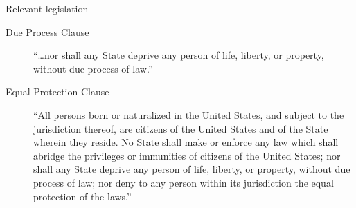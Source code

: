 \documentclass[parskip=half-]{scrartcl}
\begin{document}
\begin{frame}{Relevant legislation}
\begin{description}
	\item[Due Process Clause] ``\ldots nor shall any State deprive any person of life, liberty, or property, without due process of law.''
	\item[Equal Protection Clause] ``All persons born or naturalized in the United States, and subject to the jurisdiction thereof, are citizens of the United States and of the State wherein they reside. No State shall make or enforce any law which shall abridge the privileges or immunities of citizens of the United States; nor shall any State deprive any person of life, liberty, or property, without due process of law; nor deny to any person within its jurisdiction the equal protection of the laws.''
\end{description}
\end{frame}

\end{document}

